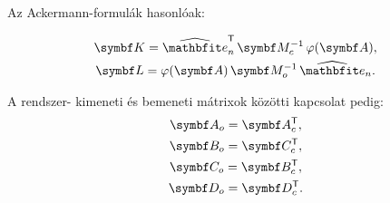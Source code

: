 Az Ackermann-formulák hasonlóak:

\begin{gather}
  \rmat K
  = \uvec e^\T_n
  \,\rmat M_c^{-1}
  \,\varphi(\rmat A)
  ,
  \\
  \rmat L
  = \varphi(\rmat A)
  \,\rmat M_o^{-1}
  \,\uvec e_n
  .
\end{gather}

A rendszer- kimeneti és bemeneti mátrixok közötti kapcsolat pedig:
\begin{gather}
  \rmat A_o = \rmat A_c^\T, \\
  \rmat B_o = \rmat C_c^\T, \\
  \rmat C_o = \rmat B_c^\T, \\
  \rmat D_o = \rmat D_c^\T.
\end{gather}

\clearpage
